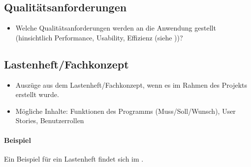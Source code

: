 \subsection{Qualitätsanforderungen}
\label{sec:Qualitaetsanforderungen}
\begin{itemize}
	\item Welche Qualitätsanforderungen werden an die Anwendung gestellt (\zB hinsichtlich Performance, Usability, Effizienz \etc (siehe \citet{ISO9126}))?
\end{itemize}


\subsection{Lastenheft/Fachkonzept}
\label{sec:Lastenheft}
\begin{itemize}
	\item Auszüge aus dem Lastenheft/Fachkonzept, wenn es im Rahmen des Projekts erstellt wurde.
	\item Mögliche Inhalte: Funktionen des Programms (Muss/Soll/Wunsch), User Stories, Benutzerrollen
\end{itemize}

\paragraph{Beispiel}
Ein Beispiel für ein Lastenheft findet sich im . 
